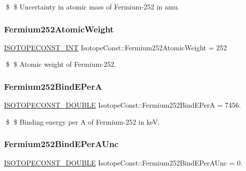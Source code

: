 \$ \$ Uncertainty in atomic mass of Fermium-\/252 in amu. \mbox{\label{group___isotope_const-_fermium-_fm252_ga7154fb144236f932171dba6284e74490}} 
\subsubsection{\texorpdfstring{Fermium252\+Atomic\+Weight}{Fermium252AtomicWeight}}
{\footnotesize\ttfamily \mbox{\hyperlink{group___isotope_const-_macros_ga5f18360b3e99483a35c32d789e62621c}{I\+S\+O\+T\+O\+P\+E\+C\+O\+N\+S\+T\+\_\+\+I\+NT}} Isotope\+Const\+::\+Fermium252\+Atomic\+Weight = 252}

\$ \$ Atomic weight of Fermium-\/252. \mbox{\label{group___isotope_const-_fermium-_fm252_ga6f60557b1bac7727719e654708d7b78f}} 
\subsubsection{\texorpdfstring{Fermium252\+Bind\+E\+PerA}{Fermium252BindEPerA}}
{\footnotesize\ttfamily \mbox{\hyperlink{group___isotope_const-_macros_ga8f45a7272ce02c0b4c65c44636ed719a}{I\+S\+O\+T\+O\+P\+E\+C\+O\+N\+S\+T\+\_\+\+D\+O\+U\+B\+LE}} Isotope\+Const\+::\+Fermium252\+Bind\+E\+PerA = 7456.}

\$ \$ Binding energy per A of Fermium-\/252 in keV. \mbox{\label{group___isotope_const-_fermium-_fm252_gad5429ddc5ba116bea3a4c47a299a1424}} 
\subsubsection{\texorpdfstring{Fermium252\+Bind\+E\+Per\+A\+Unc}{Fermium252BindEPerAUnc}}
{\footnotesize\ttfamily \mbox{\hyperlink{group___isotope_const-_macros_ga8f45a7272ce02c0b4c65c44636ed719a}{I\+S\+O\+T\+O\+P\+E\+C\+O\+N\+S\+T\+\_\+\+D\+O\+U\+B\+LE}} Isotope\+Const\+::\+Fermium252\+Bind\+E\+Per\+A\+Unc = 0.}

